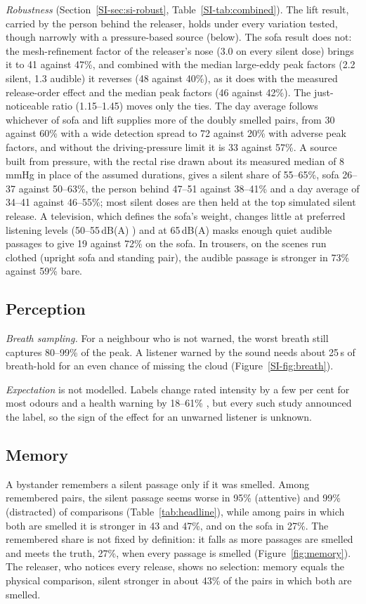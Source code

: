 \emph{Robustness} (Section~\ref{SI-sec:si-robust}, Table~\ref{SI-tab:combined}). The lift result, carried by the
person behind the releaser, holds under every variation tested, though narrowly with a pressure-based source (below).
The sofa result does not: the mesh-refinement factor of the releaser's nose (3.0 on every silent dose) brings it to 41
against 47\%, and combined with the median large-eddy peak factors (2.2 silent, 1.3 audible) it reverses (48 against
40\%), as it does with the measured release-order effect and the median peak factors (46 against 42\%). The
just-noticeable ratio (1.15--1.45) moves only the ties. The day average follows whichever of sofa and lift supplies
more of the doubly smelled pairs, from 30 against 60\% with a wide detection spread to 72 against 20\% with adverse
peak factors, and without the driving-pressure limit it is 33 against 57\%. A source built from pressure, with the
rectal rise drawn about its measured median of 8\,mmHg \cite{miller1988b} in place of the assumed durations, gives a
silent share of 55--65\%, sofa 26--37 against 50--63\%, the person behind 47--51 against 38--41\% and a day average of
34--41 against 46--55\%; most silent doses are then held at the top simulated silent release. A television, which
defines the sofa's weight, changes little at preferred listening levels (50--55\,dB(A) \cite{kurakata1999}) and at
65\,dB(A) masks enough quiet audible passages to give 19 against 72\% on the sofa. In trousers, on the scenes run
clothed (upright sofa and standing pair), the audible passage is stronger in 73\% against 59\% bare.

\subsection{Perception}
\label{sec:res-perception}
\emph{Breath sampling.} For a neighbour who is not warned, the worst breath still captures 80--99\% of the peak. A
listener warned by the sound needs about 25\,s of breath-hold for an even chance of missing the cloud
(Figure~\ref{SI-fig:breath}).

\emph{Expectation} is not modelled. Labels change rated intensity by a few per cent for most odours
\cite{herz2001,djordjevic2008} and a health warning by 18--61\% \cite{dalton1999}, but every such study announced the
label, so the sign of the effect for an unwarned listener is unknown.

\subsection{Memory}
\label{sec:res-memory}
A bystander remembers a silent passage only if it was smelled. Among remembered pairs, the silent passage seems
worse in 95\% (attentive) and 99\% (distracted) of comparisons (Table~\ref{tab:headline}), while among pairs in
which both are smelled it is stronger in 43 and 47\%, and on the sofa in 27\%. The remembered share is not
fixed by definition: it falls as more passages are smelled and meets the truth, 27\%, when every passage is smelled
(Figure~\ref{fig:memory}). The releaser, who notices every release, shows no selection: memory equals the physical
comparison, silent stronger in about 43\% of the pairs in which both are smelled.

